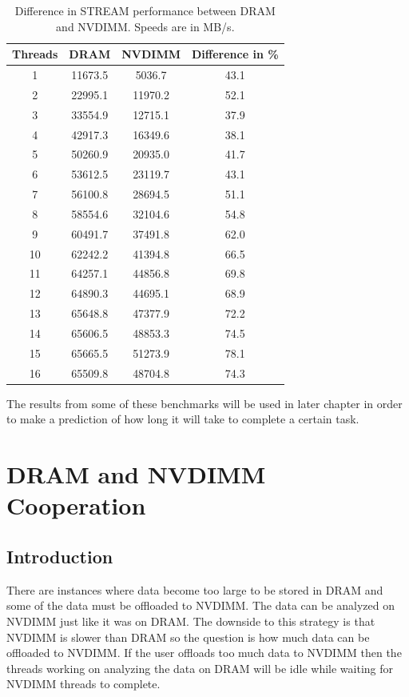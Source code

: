 \documentclass[12pt,a4paper,USenglish]{article}      %
\begin{document}
\begin{table}[!hbtp]
\centering
\begin{tabular}{ |c|c|c|c| }
\hline
Threads & DRAM & NVDIMM & Difference in \%\\
\hline
1 & 11673.5 & 5036.7 & 43.1 \\
\hline
2 & 22995.1 & 11970.2 & 52.1 \\
\hline
3 & 33554.9 & 12715.1 & 37.9 \\
\hline
4 & 42917.3 & 16349.6 & 38.1 \\
\hline
5 & 50260.9 & 20935.0 & 41.7 \\
\hline
6 & 53612.5 & 23119.7 & 43.1 \\
\hline
7 & 56100.8 & 28694.5 & 51.1 \\
\hline
8 & 58554.6 & 32104.6 & 54.8 \\
\hline
9 & 60491.7 & 37491.8 & 62.0 \\
\hline
10 & 62242.2 & 41394.8 & 66.5 \\
\hline
11 & 64257.1 & 44856.8 & 69.8 \\
\hline
12 & 64890.3 & 44695.1 & 68.9 \\
\hline
13 & 65648.8 & 47377.9 & 72.2 \\
\hline
14 & 65606.5 & 48853.3 & 74.5 \\
\hline
15 & 65665.5 & 51273.9 & 78.1 \\
\hline
16 & 65509.8 & 48704.8 & 74.3 \\
\hline
\end{tabular}
\caption{Difference in STREAM performance between DRAM and NVDIMM. Speeds are in MB/s.}
\label{tab:Q1}
\end{table}

The results from some of these benchmarks will be used in later chapter in order to make a prediction of how long it will take to complete a certain task. 

\clearpage
\section{DRAM and NVDIMM Cooperation}
\label{Chapter:Cooperation}
\subsection{Introduction}
There are instances where data become too large to be stored in DRAM and some of the data must be offloaded to NVDIMM. The data can be analyzed on NVDIMM just like it was on DRAM.
The downside to this strategy is that NVDIMM is slower than DRAM so the question is how much data can be offloaded to NVDIMM. If the user offloads too much data to NVDIMM then the threads working on analyzing the data on DRAM will be idle while waiting for NVDIMM threads to complete.
\end{document}
